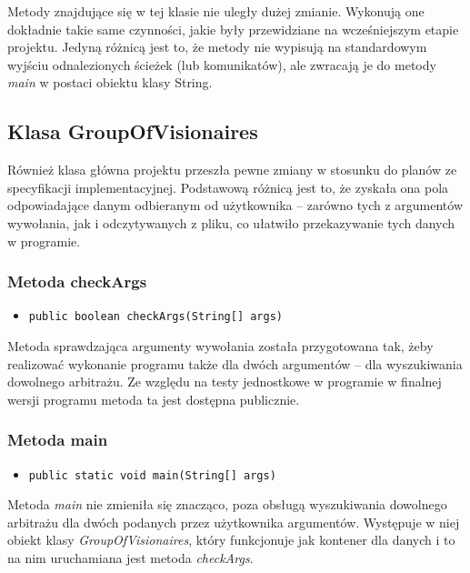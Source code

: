 \documentclass[a4paper,12pt]{article}
\newcommand\tab[1][0.6cm]{\hspace*{#1}}
\begin{document}
\tab Metody znajdujące się w tej klasie nie uległy dużej zmianie. Wykonują one dokładnie takie same czynności, jakie były przewidziane na wcześniejszym etapie projektu. Jedyną różnicą jest to, że metody nie wypisują na standardowym wyjściu odnalezionych ścieżek (lub komunikatów), ale zwracają je do metody \textit{main} w postaci obiektu klasy String.

\subsection{Klasa GroupOfVisionaires} 

\tab Również klasa główna projektu przeszła pewne zmiany w stosunku do planów ze specyfikacji implementacyjnej. Podstawową różnicą jest to, że zyskała ona pola odpowiadające danym odbieranym od użytkownika -- zarówno tych z argumentów wywołania, jak i odczytywanych z pliku, co ułatwiło przekazywanie tych danych w programie.

\subsubsection{Metoda checkArgs}

\begin{itemize}
\item \begin{lstlisting}
public boolean checkArgs(String[] args)
\end{lstlisting}
\end{itemize}

\tab Metoda sprawdzająca argumenty wywołania została przygotowana tak, żeby realizować wykonanie programu także dla dwóch argumentów -- dla wyszukiwania dowolnego arbitrażu. Ze względu na testy jednostkowe w programie w finalnej wersji programu metoda ta jest dostępna publicznie.

\subsubsection{Metoda main}

\begin{itemize}
\item \begin{lstlisting}
public static void main(String[] args)
\end{lstlisting}
\end{itemize}

\tab Metoda \textit{main} nie zmieniła się znacząco, poza obsługą wyszukiwania dowolnego arbitrażu dla dwóch podanych przez użytkownika argumentów. Występuje w niej obiekt klasy \textit{GroupOfVisionaires}, który funkcjonuje jak kontener dla danych i to na nim uruchamiana jest metoda \textit{checkArgs}.
\end{document}
